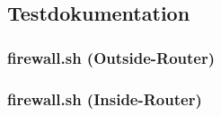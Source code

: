 \subsection{Testdokumentation}
\label{app:Test}

\subsubsection{firewall.sh (Outside-Router)}


\subsubsection{firewall.sh (Inside-Router)}
